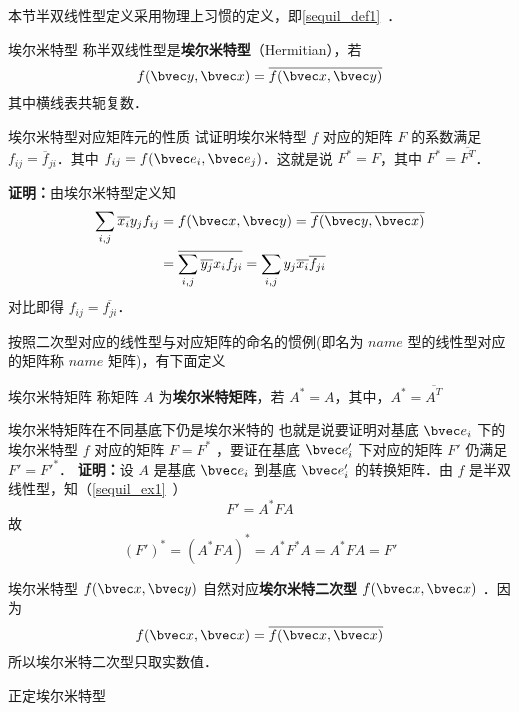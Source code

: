 本节半双线性型定义采用物理上习惯的定义，即\autoref{sequil_def1}~．
\begin{definition}{埃尔米特型}
称半双线性型是\textbf{埃尔米特型}（Hermitian），若
\begin{equation}\label{HeFor_eq2}
f(\bvec y,\bvec x)=\overline{f(\bvec x,\bvec y)}
\end{equation}
其中横线表共轭复数．
\end{definition}
\begin{example}{埃尔米特型对应矩阵元的性质}
试证明埃尔米特型 $f$ 对应的矩阵 $F$ 的系数满足 $f_{ij}=\overline f_{ji}$．其中 $f_{ij}=f(\bvec e_i,\bvec e_j)$．这就是说 $F^*=F$，其中 $F^*=\overline {F^T}$．

\textbf{证明：}由埃尔米特型定义知
\begin{equation}
\begin{aligned}
\sum_{i,j}\overline{x_i}y_j f_{ij}&=f(\bvec x,\bvec y)=\overline{f(\bvec y,\bvec x)}\\
&=\overline{\sum_{i,j}\overline{y_j} x_i f_{ji}}=\sum_{i,j}y_j\overline{x_i}\overline{f_{ji}}
\end{aligned}
\end{equation}
对比即得 $f_{ij}=\overline{f_{ji}}$．
\end{example}
按照二次型对应的线性型与对应矩阵的命名的惯例(即名为 $name$ 型的线性型对应的矩阵称 $name$ 矩阵)，有下面定义
\begin{definition}{埃尔米特矩阵}
称矩阵 $A$ 为\textbf{埃尔米特矩阵}，若 $A^*=A$，其中，$A^*=\overline{A^T}$
\end{definition}
\begin{example}{埃尔米特矩阵在不同基底下仍是埃尔米特的}
也就是说要证明对基底 $\bvec e_i$ 下的埃尔米特型 $f$ 对应的矩阵 $F=F^*$ ，要证在基底 $\bvec e'_i$ 下对应的矩阵 $F'$ 仍满足 $F'=F'^*$．
\textbf{证明：}设 $A$ 是基底 $\bvec e_i$ 到基底 $\bvec e'_i$ 的转换矩阵．由 $f$ 是半双线性型，知（\autoref{sequil_ex1}~）
\begin{equation}
F'=A^*FA
\end{equation}
 故
\begin{equation}
(F')^*=(A^*FA)^*=A^*F^*A=A^*FA=F'
\end{equation}
\end{example}
埃尔米特型 $f(\bvec x,\bvec y)$ 自然对应\textbf{埃尔米特二次型} $f(\bvec x,\bvec x)$ ．因为
\begin{equation}
 f(\bvec x,\bvec x)= \overline{f(\bvec x,\bvec x)} 
\end{equation}
所以埃尔米特二次型只取实数值．

\begin{definition}{正定埃尔米特型}

\end{definition}